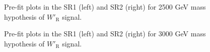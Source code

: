 \begin{figure}[H]
  \centering
  \caption{Pre-fit plots in the SR1 (left) and SR2 (right) for 2500 GeV mass hypothesis of $W'_{\text{R}}$ signal.}
  \label{fig:Prefit_WpRH2500_Asimov}
\end{figure}
\begin{figure}[H]
  \centering
  \caption{Pre-fit plots in the SR1 (left) and SR2 (right) for 3000 GeV mass hypothesis of $W'_{\text{R}}$ signal.}
  \label{fig:Prefit_WpRH3000_Asimov}
\end{figure}
